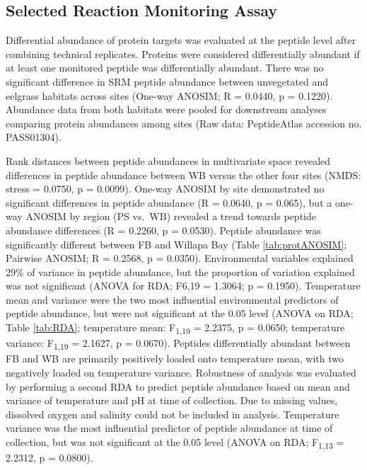 \documentclass [11pt, proquest] {uwthesis}[2015/03/03]
\begin{document}
\hypertarget{selected-reaction-monitoring-assay-1}{%
\subsection{Selected Reaction Monitoring Assay}\label{selected-reaction-monitoring-assay-1}}

Differential abundance of protein targets was evaluated at the peptide level after combining technical replicates. Proteins were considered differentially abundant if at least one monitored peptide was differentially abundant. There was no significant difference in SRM peptide abundance between unvegetated and eelgrass habitats across sites (One-way ANOSIM; R = 0.0440, p = 0.1220). Abundance data from both habitats were pooled for downstream analyses comparing protein abundances among sites (Raw data: PeptideAtlas accession no. PASS01304).

Rank distances between peptide abundances in multivariate space revealed differences in peptide abundance between WB versus the other four sites (NMDS: stress = 0.0750, p = 0.0099). One-way ANOSIM by site demonstrated no significant differences in peptide abundance (R = 0.0640, p = 0.065), but a one-way ANOSIM by region (PS vs.~WB) revealed a trend towards peptide abundance differences (R = 0.2260, p = 0.0530). Peptide abundance was significantly different between FB and Willapa Bay (Table \ref{tab:protANOSIM}; Pairwise ANOSIM; R = 0.2568, p = 0.0350). Environmental variables explained 29\% of variance in peptide abundance, but the proportion of variation explained was not significant (ANOVA for RDA; F6,19 = 1.3064; p = 0.1950). Temperature mean and variance were the two most influential environmental predictors of peptide abundance, but were not significant at the 0.05 level (ANOVA on RDA; Table \ref{tab:RDA}; temperature mean: F\textsubscript{1,19} = 2.2375, p = 0.0650; temperature variance: F\textsubscript{1,19} = 2.1627, p = 0.0670). Peptides differentially abundant between FB and WB are primarily positively loaded onto temperature mean, with two negatively loaded on temperature variance. Robustness of analysis was evaluated by performing a second RDA to predict peptide abundance based on mean and variance of temperature and pH at time of collection. Due to missing values, dissolved oxygen and salinity could not be included in analysis. Temperature variance was the most influential predictor of peptide abundance at time of collection, but was not significant at the 0.05 level (ANOVA on RDA; F\textsubscript{1,13} = 2.2312, p = 0.0800).
\end{document}

